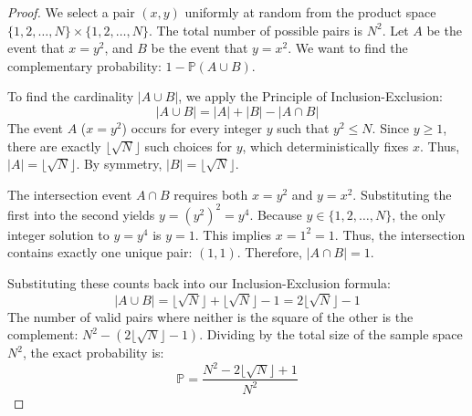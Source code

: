 \documentclass[11pt, a4paper]{article}
\theoremstyle{definition}
\theoremstyle{plain}
\begin{document}
\begin{proof}
We select a pair $(x, y)$ uniformly at random from the product space $\{1, 2, \dots, N\} \times \{1, 2, \dots, N\}$. The total number of possible pairs is $N^2$.
Let $A$ be the event that $x = y^2$, and $B$ be the event that $y = x^2$. We want to find the complementary probability: $1 - \mathbb{P}(A \cup B)$.

To find the cardinality $|A \cup B|$, we apply the Principle of Inclusion-Exclusion:
\[
|A \cup B| = |A| + |B| - |A \cap B|
\]
The event $A$ ($x = y^2$) occurs for every integer $y$ such that $y^2 \le N$. Since $y \ge 1$, there are exactly $\lfloor \sqrt{N} \rfloor$ such choices for $y$, which deterministically fixes $x$. Thus, $|A| = \lfloor \sqrt{N} \rfloor$. By symmetry, $|B| = \lfloor \sqrt{N} \rfloor$.

The intersection event $A \cap B$ requires both $x = y^2$ and $y = x^2$. Substituting the first into the second yields $y = (y^2)^2 = y^4$.
Because $y \in \{1, 2, \dots, N\}$, the only integer solution to $y = y^4$ is $y = 1$. This implies $x = 1^2 = 1$. Thus, the intersection contains exactly one unique pair: $(1, 1)$. Therefore, $|A \cap B| = 1$.

Substituting these counts back into our Inclusion-Exclusion formula:
\[
|A \cup B| = \lfloor \sqrt{N} \rfloor + \lfloor \sqrt{N} \rfloor - 1 = 2\lfloor \sqrt{N} \rfloor - 1
\]
The number of valid pairs where neither is the square of the other is the complement: $N^2 - (2\lfloor \sqrt{N} \rfloor - 1)$. 
Dividing by the total size of the sample space $N^2$, the exact probability is:
\[
\mathbb{P} = \frac{N^2 - 2\lfloor \sqrt{N} \rfloor + 1}{N^2}
\]
\end{proof}
\end{document}
